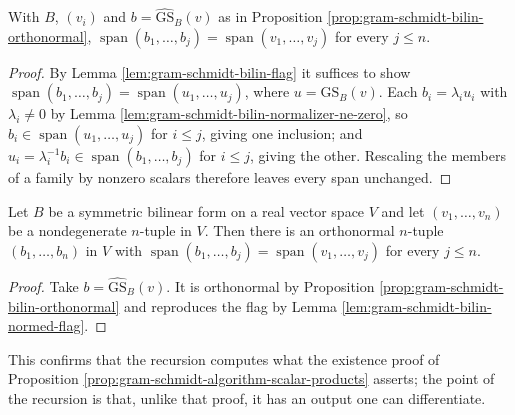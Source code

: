 \begin{lemma}
\label{lem:gram-schmidt-bilin-normed-flag}
\leanok
{}
With $B$, $(v_i)$ and $b = \widehat{\mathrm{GS}}_B(v)$ as in Proposition \ref{prop:gram-schmidt-bilin-orthonormal}, $\operatorname{span}(b_1,\ldots,b_j) = \operatorname{span}(v_1,\ldots,v_j)$ for every $j \leq n$.
\end{lemma}

\begin{proof}
\leanok
{}
By Lemma \ref{lem:gram-schmidt-bilin-flag} it suffices to show $\operatorname{span}(b_1,\ldots,b_j) = \operatorname{span}(u_1,\ldots,u_j)$, where $u = \mathrm{GS}_B(v)$. Each $b_i = \lambda_i u_i$ with $\lambda_i \neq 0$ by Lemma \ref{lem:gram-schmidt-bilin-normalizer-ne-zero}, so $b_i \in \operatorname{span}(u_1,\ldots,u_j)$ for $i \leq j$, giving one inclusion; and $u_i = \lambda_i^{-1} b_i \in \operatorname{span}(b_1,\ldots,b_j)$ for $i \leq j$, giving the other. Rescaling the members of a family by nonzero scalars therefore leaves every span unchanged.
\end{proof}

\begin{corollary}
\label{cor:gram-schmidt-bilin-recovers}
\leanok
{}
Let $B$ be a symmetric bilinear form on a real vector space $V$ and let $(v_1,\ldots,v_n)$ be a nondegenerate $n$-tuple in $V$. Then there is an orthonormal $n$-tuple $(b_1,\ldots,b_n)$ in $V$ with $\operatorname{span}(b_1,\ldots,b_j) = \operatorname{span}(v_1,\ldots,v_j)$ for every $j \leq n$.
\end{corollary}

\begin{proof}
\leanok
{}
Take $b = \widehat{\mathrm{GS}}_B(v)$. It is orthonormal by Proposition \ref{prop:gram-schmidt-bilin-orthonormal} and reproduces the flag by Lemma \ref{lem:gram-schmidt-bilin-normed-flag}.
\end{proof}

This confirms that the recursion computes what the existence proof of Proposition \ref{prop:gram-schmidt-algorithm-scalar-products} asserts; the point of the recursion is that, unlike that proof, it has an output one can differentiate.

